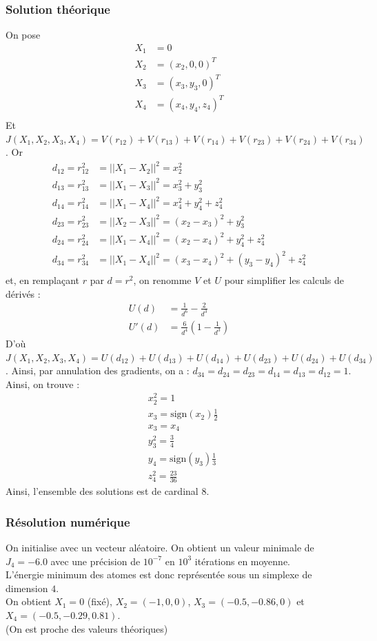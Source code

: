 \documentclass[paper=a4, fontsize=11pt]{article}
\begin{document}
\subsubsection{Solution théorique}
On pose 
\begin{align*}
X_1 &= 0 \\
X_2 &= (x_2,0,0)^T\\
X_3 &= (x_3,y_3,0)^T\\
X_4 &= (x_4,y_4,z_4)^T\\
\end{align*}
Et $J(X_1,X_2,X_3,X_4) = V(r_{12}) + V(r_{13}) + V(r_{14}) + V(r_{23}) + V(r_{24}) + V(r_{34})$.
Or 
\begin{align*}
d_{12} = r_{12}^2 &= ||X_1 - X_2||^2 = x_2^2\\
d_{13} = r_{13}^2 &= ||X_1 - X_3||^2 = x_3^2 + y_3^2\\
d_{14} = r_{14}^2 &= ||X_1 - X_4||^2 = x_4^2 + y_4^2 + z_4^2\\
d_{23} = r_{23}^2 &= ||X_2 - X_3||^2 = (x_2-x_3)^2 + y_3^2\\
d_{24} = r_{24}^2 &= ||X_1 - X_4||^2 = (x_2-x_4)^2 + y_4^2 + z_4^2\\
d_{34} = r_{34}^2 &= ||X_1 - X_4||^2 = (x_3-x_4)^2 + (y_3-y_4)^2 + z_4^2\\
\end{align*}
et, en remplaçant $r$ par $d=r^2$, on renomme $V$ et $U$ pour simplifier les calculs de dérivés :
\begin{align*}
U(d) &= \frac{1}{d^6} - \frac{2}{d^3}\\
U'(d) &= \frac{6}{d^4}(1-\frac{1}{d^3})
\end{align*}
D'où $J(X_1,X_2,X_3,X_4) = U(d_{12}) + U(d_{13}) + U(d_{14}) + U(d_{23}) + U(d_{24}) + U(d_{34})$.
Ainsi, par annulation des gradients, on a : $d_{34} = d_{24} = d_{23} = d_{14} = d_{13} = d_{12} = 1$.
Ainsi, on trouve : 
\begin{align*}
&x_2^2 = 1 \\
&x_3 = \text{sign}(x_2)\frac{1}{2}\\
&x_3 = x_4\\
&y_3^2 = \frac{3}{4}\\
&y_4 = \text{sign}(y_3)\frac{1}{3}\\
&z_4^2 = \frac{23}{36} 
\end{align*}
Ainsi, l'ensemble des solutions est de cardinal $8$.
\subsubsection{Résolution numérique}
On initialise avec un vecteur aléatoire. 
On obtient un valeur minimale de $J_4 = -6.0$ avec une précision de $10^{-7}$ en $10^3$ itérations en moyenne. \\
L'énergie minimum des atomes est donc représentée sous un simplexe de dimension $4$.\\
On obtient $X_1 = 0$ (fixé), $X_2 = (-1,0,0)$, $X_3 = (-0.5,-0.86,0)$ et $X_4 = (-0.5,-0.29,0.81)$.\\
(On est proche des valeurs théoriques)
\end{document}
